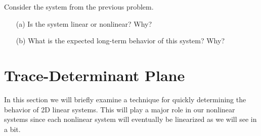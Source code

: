 \begin{problem}
    Consider the system from the previous problem.
    \begin{enumerate}
        \item[(a)] Is the system linear or nonlinear?  Why?
        \item[(b)] What is the expected long-term behavior of this system?  Why?
    \end{enumerate}
\end{problem}


\newpage\section{Trace-Determinant Plane}
In this section we will briefly examine a technique for quickly determining
the behavior of 2D linear systems.  This will play a major role in our nonlinear systems
since each nonlinear system will eventually be linearized as we will see in a bit.  


